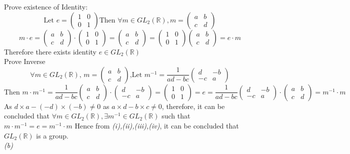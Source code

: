\documentclass[11pt]{article}
\newenvironment{problem}[2][Problem]{\begin{trivlist}
\item[\hskip \labelsep {\bfseries #1}\hskip \labelsep {\bfseries #2.}]}{\end{trivlist}}
\begin{document}
\begin{problem}{1}
 Prove existence of Identity:\\
\[\text{Let } e = 
\begin{pmatrix}
 1 & 0\\
 0 & 1
\end{pmatrix}
\text{Then $\forall m \in GL_{2}(\mathbb{R}), m=$}
\begin{pmatrix}
    a & b\\
    c & d
\end{pmatrix}
\]
\[
m \cdot e =
\begin{pmatrix}
a & b\\
c & d
\end{pmatrix}
\cdot
\begin{pmatrix}
    1 & 0\\
    0 & 1
\end{pmatrix}
=
\begin{pmatrix}
 a & b\\
 c & d
\end{pmatrix}
=
\begin{pmatrix}
    1 & 0\\
    0 & 1
\end{pmatrix}
\begin{pmatrix}
    a & b\\
    c & d
\end{pmatrix}
=
e \cdot m
\]
Therefore there exists identity $e \in GL_{2}(\mathbb{R})$\\
 Prove Inverse\\
\[ \forall m \in GL_2(\mathbb{R}) \text{, } m = 
\begin{pmatrix}
    a & b\\
    c & d
\end{pmatrix}
\text{,Let } m^{-1} = \frac{1}{ad - bc}
\begin{pmatrix}
    d & -b\\
    -c & a
\end{pmatrix}
\]
\[\text{Then } m \cdot m^{-1} = \frac{1}{ad - bc}
\begin{pmatrix}
    a & b\\
    c & d
\end{pmatrix}
\cdot
\begin{pmatrix}
d & -b\\
-c & a
\end{pmatrix}
=
\begin{pmatrix}
    1 & 0\\
    0 & 1
\end{pmatrix} = e = \frac{1}{ad - bc}
\begin{pmatrix}
d & -b\\
-c & a
\end{pmatrix} \cdot
\begin{pmatrix}
a & b\\
c & d
\end{pmatrix} = m^{-1} \cdot m
    \]
As $d \times a - (-d) \times (-b) \neq 0$ as $ a\times d - b \times c \neq 0$, therefore, it can be
concluded that $\forall m \in GL_2(\mathbb{R}), \exists m^{-1} \in GL_2(\mathbb{R})$ such that
$m \cdot m^{-1} = e = m^{-1} \cdot m$
Hence from \textit{(i),(ii),(iii),(iv)}, it can be concluded that $GL_2(\mathbb{R})$ is a group.\\
\textit{(b)}
\end{problem}
\end{document}
